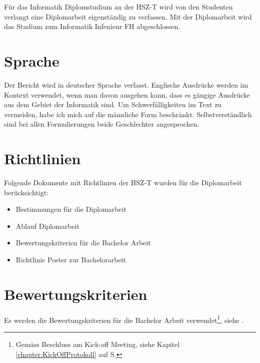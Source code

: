   Für das Informatik Diplomstudium an der \ac{HSZ-T} wird von den Studenten
  verlangt eine Diplomarbeit eigenständig zu verfassen. Mit der Diplomarbeit
  wird das Studium zum Informatik Infenieur FH abgeschlossen.
  
  \section{Sprache}
  
  Der Bericht wird in deutscher Sprache verfasst. Englische Ausdrücke werden im
  Kontext verwendet, wenn man davon ausgehen kann, dass es gängige Ausdrücke aus
  dem Gebiet der Informatik sind. Um Schwerfälligkeiten im Text zu vermeiden,
  habe ich mich auf die männliche Form beschränkt. Selbstverständlich sind bei
  allen Formulierungen beide Geschlechter angesprochen.
    
  \section{Richtlinien}
  Folgende Dokumente mit Richtlinien der \ac{HSZ-T} wurden für die Diplomarbeit
  berücksichtigt:

  \begin{itemize}
      \item Bestimmungen für die Diplomarbeit \cite{hsz_reglement}
      \item Ablauf Diplomarbeit \cite{hsz_ablauf}
      \item Bewertungskriterien für die Bachelor Arbeit
      \cite{hsz_bewertungskriterien}
      \item Richtlinie Poster zur Bachelorarbeit \cite{hsz_poster}
  \end{itemize} 
    
  \section{Bewertungskriterien}
  
  Es werden die Bewertungskriterien für die Bachelor Arbeit
  verwendet\footnote{Gemäss Beschluss am Kick-off Meeting, siehe Kapitel
  \ref{chapter:KickOffProtokoll}  auf S.
  \pageref{chapter:KickOffProtokoll}}, siehe \cite{hsz_bewertungskriterien}.
